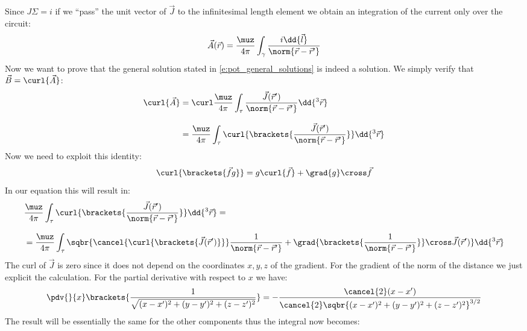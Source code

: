 Since $J\Sigma = i$ if we ``pass'' the unit vector of $\vec{J}$ to the infinitesimal length element we obtain an integration of the current only over the circuit:
\begin{equation}
  \vec{A}(\vec{r}) = \dfrac{\muz}{4 \pi }\int_{\gamma} \dfrac{i \dd{\vec{l}}}{\norm{\vec{r}-\vec{r}'}}
\end{equation}
Now we want to prove that the general solution stated in \eqref{e:pot_general_solutions} is indeed a solution. We simply verify that $\vec{B} = \curl{\vec{A}}$:
\begin{equation}
  \begin{split}
    \curl{\vec{A}} &= \curl \dfrac{\muz}{4 \pi }\int_{\tau} \dfrac{\vec{J} (\vec{r}')}{\norm{\vec{r}-\vec{r}'}}\dd{^3 \vec{r}} \\[8pt]
    &=  \dfrac{\muz}{4 \pi }\int_{\tau} \curl{\brackets{\dfrac{\vec{J} (\vec{r}')}{\norm{\vec{r}-\vec{r}'}}}} \dd{^3 \vec{r}}
  \end{split}
\end{equation}
Now we need to exploit this identity:
\begin{equation}
  \curl{\brackets{\vec{f}g}} = g\curl{\vec{f}} + \grad{g} \cross \vec{f}
\end{equation}
In our equation this will result in:
\begin{equation}
  \begin{split}
    &\dfrac{\muz}{4 \pi }\int_{\tau} \curl{\brackets{\dfrac{\vec{J} (\vec{r}')}{\norm{\vec{r}-\vec{r}'}}}} \dd{^3 \vec{r}} = \\[8pt]
    &= \dfrac{\muz}{4 \pi }\int_{\tau}\sqbr{ \cancel{\curl{\brackets{\vec{J}(\vec{r}')}}}\dfrac{1}{\norm{\vec{r}-\vec{r}'}}  + \grad{\brackets{\dfrac{1}{\norm{\vec{r}-\vec{r}'}}}} \cross \vec{J}(\vec{r}')}\dd{^3 \vec{r}}
  \end{split}
\end{equation}
The curl of $\vec{J}$ is zero since it does not depend on the coordinates $x,y,z$ of the gradient. For the gradient of the norm of the distance we just explicit the calculation. For the partial derivative with respect to $x$ we have:
\begin{equation}
  \begin{split}
    \pdv{}{x}\brackets{\dfrac{1}{\sqrt{(x-x')^2 + (y-y')^2 + (z-z')^2}}} = -\dfrac{\cancel{2}(x-x')}{\cancel{2}\sqbr{(x-x')^2 + (y-y')^2 + (z-z')^2}^{3/2}}
  \end{split}
\end{equation}
The result will be essentially the same for the other components thus the integral now becomes:
